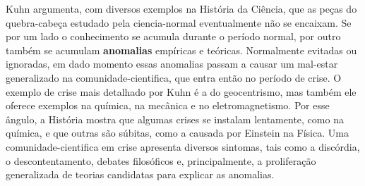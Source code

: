 \documentclass[./main.tex]{subfiles}
\begin{document}
\par Kuhn argumenta, com diversos exemplos na História da Ciência, que as peças do quebra-cabeça estudado pela \gls{ciencia-normal} eventualmente não se encaixam. Se por um lado o conhecimento se acumula durante o período normal, por outro também se acumulam \textbf{anomalias} empíricas e teóricas. Normalmente evitadas ou ignoradas, em dado momento essas anomalias passam a causar um mal-estar generalizado na \gls{comunidade-cientifica}, que entra então no período de crise. O exemplo de crise mais detalhado por Kuhn é a do geocentrismo, mas também ele oferece exemplos na química, na mecânica e no eletromagnetismo. Por esse ângulo, a História mostra que algumas crises se instalam lentamente, como na química, e que outras são súbitas, como a causada por Einstein na Física. Uma \gls{comunidade-cientifica} em crise apresenta diversos sintomas, tais como a discórdia, o descontentamento, debates filosóficos e, principalmente, a proliferação generalizada de teorias candidatas para explicar as anomalias.
\end{document}
